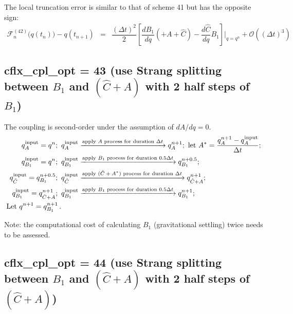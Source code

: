 \documentclass[12pt]{article}
\begin{document}
The local truncation error is similar to that of scheme 41 but has the opposite sign:
\begin{eqnarray}
\mathcal{F}_n^{(42)}\Big(q(t_n)\Big) - q(t_{n+1})
&=& \dfrac{(\Delta t)^2}{2}\left[  \dfrac{dB_1}{dq}(+A+\hat{C}) - \dfrac{d\hat{C}}{dq}B_1\right]\bigg|_{q=q^n}
+\mathcal{O}\left( (\Delta t)^3\right) 
\end{eqnarray}

\subsection{{\sf cflx\_cpl\_opt = 43} (use Strang splitting between $B_1$ and $(\hat{C}+A)$ with 2 half steps of $B_1$)}

The coupling is second-order under the assumption of $dA/dq=0$.
%
\begin{align*}
q^{\rm input}_{A} = q^n;\,\,\,
&q^{\rm input}_{A} \xrightarrow{\text{apply $A$ process for duration $\Delta t$}} q^{n+1}_{A};\,\,
\text{let}\,\, {A}^* = \dfrac{q^{n+1}_{A} - q^{\rm input}_{A}}{\Delta t}; \\
%
q^{\rm input}_{B_1} = q^n;\,\,\, 
& q^{\rm input}_{B_1} \xrightarrow{\text{apply $B_1$ process for duration $0.5\Delta t$}} q^{n+0.5}_{B_1};\,\, 
\\
%
q^{\rm input}_{\hat{C}} = q^{n+0.5}_{B_1};\,\,\, 
& q^{\rm input}_{\hat{C}}\xrightarrow{\text{apply $(\hat{C}+A^*)$ process for duration $\Delta t$}} q^{n+1}_{\hat{C}+A};\,\, 
 \\
%
q^{\rm input}_{B_1} = q^{n+1}_{\hat{C}+A};\,\,\, 
& q^{\rm input}_{B_1} \xrightarrow{\text{apply $B_1$ process for duration $0.5\Delta t$}} q^{n+1}_{B_1};\,\, 
\\
%
\text{Let}\,\, q^{n+1} = q^{n+1}_{B_1} \,.
\end{align*}

Note: the computational cost of calculating $B_1$ (gravitational settling) twice needs to be assessed.


\subsection{{\sf cflx\_cpl\_opt = 44} (use Strang splitting between $B_1$ and $(\hat{C}+A)$ with 2 half steps of $(\hat{C}+A)$)}
\end{document}
